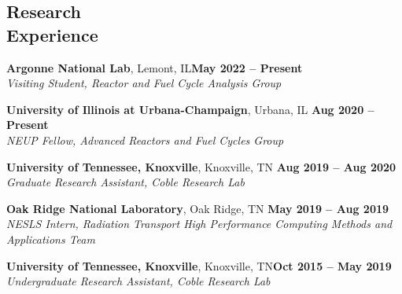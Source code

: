 \documentclass[margin,line]{resume}
\begin{document}
\begin{resume}
    \section{\mysidestyle Research\\Experience}
    \textbf{Argonne National Lab}, Lemont, IL\hfill\textbf{May 2022 -- Present}\\
    \vspace{-5mm}
        \textsl{Visiting Student, Reactor and Fuel Cycle Analysis Group}\\\vspace{-2mm}

    \textbf{University of Illinois at Urbana-Champaign}, Urbana, IL \hfill \textbf{Aug 2020 -- Present} \\
    \vspace{-5mm}
        \textsl{NEUP Fellow, Advanced Reactors and Fuel Cycles Group} \\\vspace{-2mm}
        
    \textbf{University of Tennessee, Knoxville}, Knoxville, TN \hfill \textbf{Aug 2019 -- Aug 2020}\\
    \vspace{-5mm}
        \textsl{Graduate Research Assistant, Coble Research Lab} \\ \vspace{-2mm}
    
    \textbf{Oak Ridge National Laboratory}, Oak Ridge, TN \hfill \textbf{May 2019 -- Aug 2019}\\
    \vspace{-5mm}        
        \textsl{NESLS Intern, Radiation Transport High Performance Computing Methods and Applications Team}\\ \vspace{-2mm}              
    
    \textbf{University of Tennessee, Knoxville}, Knoxville, TN\hfill\textbf{Oct 2015 -- May 2019}\\
        \vspace{-5mm}            
        \textsl{Undergraduate Research Assistant, Coble Research Lab}\\\vspace{-2mm}

    


\end{resume}
\end{document}
